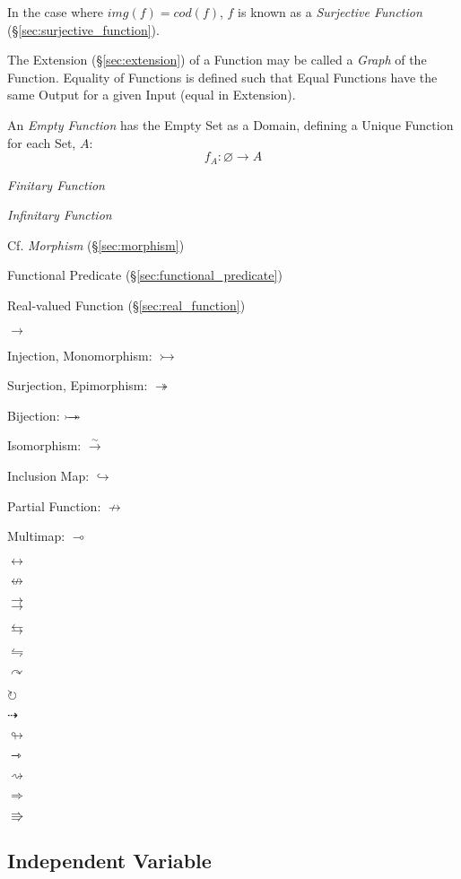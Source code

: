 In the case where $img(f) = cod(f)$, $f$ is known as a
\emph{Surjective Function} (\S\ref{sec:surjective_function}).

The Extension (\S\ref{sec:extension}) of a Function may be called a
\emph{Graph} of the Function. Equality of Functions is defined such
that Equal Functions have the same Output for a given Input (equal in
Extension).

An \emph{Empty Function} has the Empty Set as a Domain, defining a
Unique Function for each Set, $A$:
\[
  f_A : \varnothing \rightarrow A
\]

\emph{Finitary Function}

\emph{Infinitary Function}

\fist Cf. \emph{Morphism} (\S\ref{sec:morphism})

Functional Predicate (\S\ref{sec:functional_predicate})

Real-valued Function (\S\ref{sec:real_function})

$\rightarrow$

Injection, Monomorphism: $\rightarrowtail$

Surjection, Epimorphism: $\twoheadrightarrow$

Bijection: $\rightarrowtail \hspace{-8pt} \twoheadrightarrow$

Isomorphism: $\xrightarrow{\sim}$

Inclusion Map: $\hookrightarrow$

Partial Function: $\nrightarrow$

Multimap: $\multimap$

$\leftrightarrow$

$\nleftrightarrow$

$\rightrightarrows$

$\leftrightarrows$

$\leftrightharpoons$

$\curvearrowright$

$\circlearrowright$

$\dashrightarrow$

$\looparrowright$

$\rightarrowtriangle$

$\rightsquigarrow$

$\Rightarrow$

$\Rrightarrow$



\subsection{Independent Variable}\label{sec:independent_variable}

